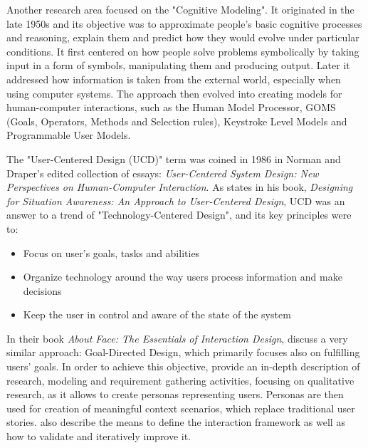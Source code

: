 \documentclass{article}
\begin{document}
Another research area focused on the "Cognitive Modeling". It originated in the late 1950s and its objective was to approximate people's basic cognitive processes and reasoning, explain them and predict how they would evolve under particular conditions. It first centered on how people solve problems symbolically by taking input in a form of symbols, manipulating them and producing output. Later it addressed how information is taken from the external world, especially when using computer systems. The approach then evolved into creating models for human-computer interactions, such as the Human Model Processor, GOMS (Goals, Operators, Methods and Selection rules), Keystroke Level Models and Programmable User Models.

The "User-Centered Design (UCD)" term was coined in 1986 in Norman and Draper's edited collection of essays: \textit{User-Centered System Design: New Perspectives on Human-Computer Interaction}. As \cite{endsley2016designing} states in his book, \textit{Designing for Situation Awareness: An Approach to User-Centered Design}, UCD was an answer to a trend of "Technology-Centered Design", and its key principles were to:
\begin{itemize}
    \item Focus on user's goals, tasks and abilities
    \item Organize technology around the way users process information and make decisions
    \item Keep the user in control and aware of the state of the system
\end{itemize}

In their book \textit{About Face: The Essentials of Interaction Design}, \cite{cooper2014face} discuss a very similar approach: Goal-Directed Design, which primarily focuses also on fulfilling users' goals. In order to achieve this objective, \citeauthor{cooper2014face} provide an in-depth description of research, modeling and requirement gathering activities, focusing on qualitative research, as it allows to create personas representing users. Personas are then used for creation of meaningful context scenarios, which replace traditional user stories. \citeauthor{cooper2014face} also describe the means to define the interaction framework as well as how to validate and iteratively improve it.
\end{document}
